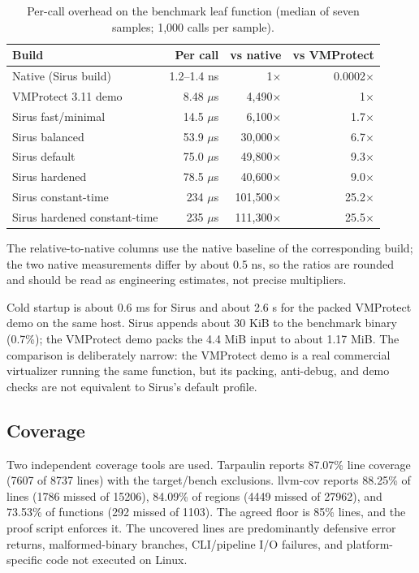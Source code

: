 \begin{table}[htbp]
\centering
\small
\caption{Per-call overhead on the benchmark leaf function (median of seven
samples; 1,000 calls per sample).}
\label{tab:perf}
\begin{tabular}{@{}lrrr@{}}
\toprule
Build & Per call & vs native & vs VMProtect \\
\midrule
Native (Sirus build) & 1.2--1.4 ns & 1$\times$ & 0.0002$\times$ \\
VMProtect 3.11 demo & 8.48 $\mu$s & 4,490$\times$ & 1$\times$ \\
Sirus fast/minimal & 14.5 $\mu$s & 6,100$\times$ & 1.7$\times$ \\
Sirus balanced & 53.9 $\mu$s & 30,000$\times$ & 6.7$\times$ \\
Sirus default & 75.0 $\mu$s & 49,800$\times$ & 9.3$\times$ \\
Sirus hardened & 78.5 $\mu$s & 40,600$\times$ & 9.0$\times$ \\
Sirus constant-time & 234 $\mu$s & 101,500$\times$ & 25.2$\times$ \\
Sirus hardened constant-time & 235 $\mu$s & 111,300$\times$ & 25.5$\times$ \\
\bottomrule
\end{tabular}
\end{table}

The relative-to-native columns use the native baseline of the corresponding
build; the two native measurements differ by about 0.5 ns, so the ratios are
rounded and should be read as engineering estimates, not precise multipliers.

Cold startup is about 0.6 ms for Sirus and about 2.6 s for the packed VMProtect
demo on the same host. Sirus appends about 30 KiB to the benchmark binary
(0.7\%); the VMProtect demo packs the 4.4 MiB input to about 1.17 MiB. The
comparison is deliberately narrow: the VMProtect demo is a real commercial
virtualizer running the same function, but its packing, anti-debug, and demo
checks are not equivalent to Sirus's default profile.

\subsection{Coverage}

Two independent coverage tools are used. Tarpaulin reports 87.07\% line coverage
(7607 of 8737 lines) with the target/bench exclusions. llvm-cov reports 88.25\%
of lines (1786 missed of 15206), 84.09\% of regions (4449 missed of 27962), and
73.53\% of functions (292 missed of 1103). The agreed floor is 85\% lines, and
the proof script enforces it. The uncovered lines are predominantly defensive
error returns, malformed-binary branches, CLI/pipeline I/O failures, and
platform-specific code not executed on Linux.


